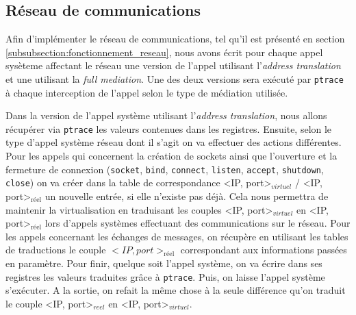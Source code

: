 \subsection{Réseau de communications}
\label{subsection:network_implementaion}

Afin d'implémenter le réseau de communications, tel qu'il est présenté en section \ref{subsubsection:fonctionnement_reseau}, nous avons écrit pour chaque appel sysèteme affectant le réseau une version de l'appel utilisant l'\textit{address translation} et une utilisant la \textit{full mediation}. Une des deux versions sera exécuté par \texttt{ptrace} à chaque interception de l'appel selon le type de médiation utilisée.

Dans la version de l'appel système utilisant l'\textit{address translation}, nous allons récupérer via \texttt{ptrace} les valeurs contenues dans les registres. Ensuite, selon le type d'appel système réseau dont il s'agit on va effectuer des actions différentes. Pour les appels qui concernent la création de sockets ainsi que l'ouverture et la fermeture de connexion (\texttt{socket}, \texttt{bind}, \texttt{connect}, \texttt{listen}, \texttt{accept}, \texttt{shutdown}, \texttt{close}) on va créer dans la table de correspondance <IP, port>$_{virtuel}$ / <IP, port>$_{\text{réel}}$ un nouvelle entrée, si elle n'existe pas déjà. Cela nous permettra de maintenir la virtualisation en traduisant les couples <IP, port>$_{virtuel}$ en <IP, port>$_{\text{réel}}$ lors d'appels systèmes effectuant des communications sur le réseau. Pour les appels concernant les échanges de messages, on récupère en utilisant les tables de traductions le couple  $<IP, port>_{\text{réel}}$ correspondant aux informations passées en paramètre. Pour finir, quelque soit l'appel système, on va écrire dans ses registres les valeurs traduites grâce à \texttt{ptrace}. Puis, on laisse l'appel système s'exécuter. A la sortie, on refait la même chose à la seule différence qu'on traduit le couple  <IP, port>$_{reel}$ en <IP, port>$_{virtuel}$.

